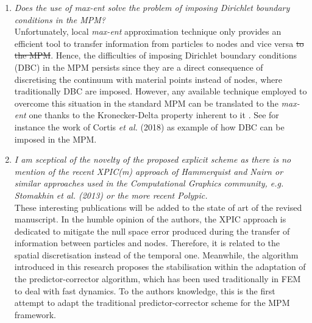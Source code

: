 \documentclass[12pt]{article}
\begin{document}
\begin{enumerate}
Concerning the first issue mentioned by the reviewer, the special case of non-convex domains was discussed by Arroyo \& Ortiz~\cite{Arroyo2006}. Some of the solutions proposed by the aforementioned authors are : the possibility of replacing the Euclidean distance $\lVert  x - x_a  \rVert$ in the definition of the shape functions by the length of the shortest path contained within the domain connecting $x$ and $x_a$. Or the decomposition of the non-convex domain into convex sub-domains.  This topic has also been extensively studied in the context of MLS-based meshfree methods, for instance visibility, diffraction, and constrained path criteria. These methods are directly applicable to local \textit{max-ent} approximation. 

\item \textit{Does the use of max-ent solve the problem of imposing Dirichlet boundary conditions in the MPM?}\\

Unfortunately, local \textit{max-ent} approximation technique only provides an efficient tool to transfer information from particles to nodes and vice versa \sout{to the MPM}. Hence, the difficulties of imposing Dirichlet boundary conditions (DBC) in the MPM persists since they are a direct consequence of discretising the continuum with material points instead of nodes, where traditionally DBC are imposed. However, any available technique employed to overcome this situation in the standard MPM can be translated to the \textit{max-ent} one thanks to the Kronecker-Delta property inherent to it \cite{Arroyo2006}. See for instance the work of Cortis {\it et al.} (2018) \cite{Cortis_et_al_2017_IJNME} as example of how DBC can be imposed in the MPM.

\item \textit{I am sceptical of the novelty of the proposed explicit scheme as there is no mention of the recent XPIC(m) approach of Hammerquist and Nairn or similar approaches used in the Computational Graphics community, e.g. Stomakhin et al. (2013) or the more recent Polypic.}\\

These interesting publications will be added to the state of art of the revised manuscript. In the humble opinion of the authors, the XPIC approach is dedicated to mitigate the null space error produced during the transfer of information between particles and nodes. Therefore, it is related to the spatial discretisation instead of the temporal one. Meanwhile, the algorithm introduced in this research proposes the stabilisation within the adaptation of the predictor-corrector algorithm, which has been used traditionally in FEM to deal with fast dynamics. To the author\textquotesingle s knowledge, this is the first attempt to adapt the  traditional predictor-corrector scheme for the MPM framework. 

\end{enumerate}
\end{document}
